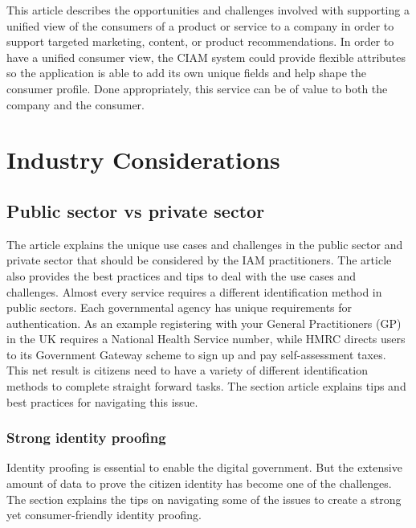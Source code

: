 This article describes the opportunities and challenges involved with
supporting a unified view of the consumers of a product or service to a
company in order to support targeted marketing, content, or product
recommendations. In order to have a unified consumer view, the CIAM
system could provide flexible attributes so the application is able to
add its own unique fields and help shape the consumer profile. Done
appropriately, this service can be of value to both the company and the
consumer.

\hypertarget{industry-considerations}{%
\section{Industry Considerations}\label{industry-considerations}}

\hypertarget{public-sector-vs-private-sector}{%
\subsection{Public sector vs private
sector}\label{public-sector-vs-private-sector}}

The article explains the unique use cases and challenges in the public
sector and private sector that should be considered by the IAM
practitioners. The article also provides the best practices and tips to
deal with the use cases and challenges. Almost every service requires a
different identification method in public sectors. Each governmental
agency has unique requirements for authentication. As an example
registering with your General Practitioners (GP) in the UK requires a
National Health Service number, while HMRC directs users to its
Government Gateway scheme to sign up and pay self-assessment taxes. This
net result is citizens need to have a variety of different
identification methods to complete straight forward tasks. The section
article explains tips and best practices for navigating this issue.

\hypertarget{strong-identity-proofing}{%
\subsubsection{Strong identity proofing}\label{strong-identity-proofing}}

Identity proofing is essential to enable the digital government. But the
extensive amount of data to prove the citizen identity has become one of
the challenges. The section explains the tips on navigating some of the
issues to create a strong yet consumer-friendly identity proofing.

